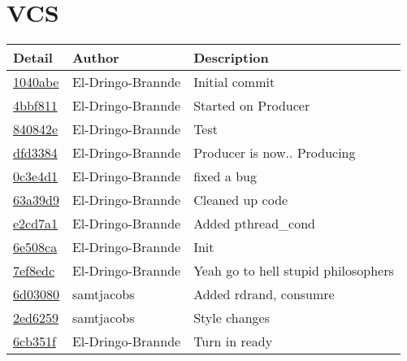 \documentclass{article}
\begin{document}
\section{VCS}
\begin{tabular}{l l l}\textbf{Detail} & \textbf{Author} & \textbf{Description}\\\hline
\href{https://github.com/El-Dringo-Brannde/CS444/commit/1040abe06276b44779d7090f4dcf3f12aa14f5ff}{1040abe} & El-Dringo-Brannde & Initial commit\\\hline
\href{https://github.com/El-Dringo-Brannde/CS444/commit/4bbf81171861f808e93ce47478cca496c0b0fe89}{4bbf811} & El-Dringo-Brannde & Started on Producer\\\hline
\href{https://github.com/El-Dringo-Brannde/CS444/commit/840842e72c16c3dd8c5a4971e0ce27ce91b65e69}{840842e} & El-Dringo-Brannde & Test\\\hline
\href{https://github.com/El-Dringo-Brannde/CS444/commit/dfd33841d968202f1a7e17cad93e5171b0686031}{dfd3384} & El-Dringo-Brannde & Producer is now.. Producing\\\hline
\href{https://github.com/El-Dringo-Brannde/CS444/commit/0c3e4d1e938f4b736ec4c0db4342038bd5dbc06a}{0c3e4d1} & El-Dringo-Brannde & fixed a bug\\\hline
\href{https://github.com/El-Dringo-Brannde/CS444/commit/63a39d9f2c3d49abb6fcdd5bfc623eb6ac356553}{63a39d9} & El-Dringo-Brannde & Cleaned up code\\\hline
\href{https://github.com/El-Dringo-Brannde/CS444/commit/e2cd7a11800994774664033637c8bcd272c74500}{e2cd7a1} & El-Dringo-Brannde & Added pthread_cond\\\hline
\href{https://github.com/El-Dringo-Brannde/CS444/commit/6e508cad4770626bda31e3f012b218896bf1cf7c}{6e508ca} & El-Dringo-Brannde & Init\\\hline
\href{https://github.com/El-Dringo-Brannde/CS444/commit/7ef8edc8e4f22f96c3244cd9075975966d6096c0}{7ef8edc} & El-Dringo-Brannde & Yeah go to hell stupid philosophers\\\hline
\href{https://github.com/El-Dringo-Brannde/CS444/commit/6d030800ec382b329314ca25581e016269790a0c}{6d03080} & samtjacobs & Added rdrand, consumre\\\hline
\href{https://github.com/El-Dringo-Brannde/CS444/commit/2ed62596d4850551f192b7e5b8175e69526b1bd8}{2ed6259} & samtjacobs & Style changes\\\hline
\href{https://github.com/El-Dringo-Brannde/CS444/commit/6cb351f9c34417f60e7f8d71a179d2eb09c335b4}{6cb351f} & El-Dringo-Brannde & Turn in ready\\\hline

\end{tabular}
\end{document}
